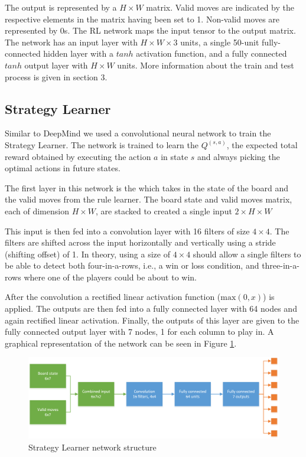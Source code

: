 The output is represented by a $H \times W$ matrix. Valid moves are indicated by the respective elements in the matrix having been set to 1. Non-valid moves are represented by 0s.
The RL network maps the input tensor to the output matrix. The network has an input layer with $H \times W \times 3$ units, a single 50-unit fully-connected hidden layer with a $tanh$ activation function, and a fully connected $tanh$ output layer with $H \times W$ units. More information about the train and test process is given in section 3.

\subsection{Strategy Learner}
Similar to DeepMind we used a convolutional neural network to train the Strategy Learner. The network is trained to learn the $Q^(s, a)$, the expected total reward obtained by executing the action $a$ in state $s$ and always picking the optimal actions in future states.

The first layer in this network is the which takes in the state of the board and the valid moves from the rule learner. The board state and valid moves matrix, each of dimension $H \times W$, are stacked to created a single input $2 \times H \times W$

This input is then fed into a convolution layer with 16 filters of size $4 \times 4$. The filters are shifted across the input horizontally and vertically using a stride (shifting offset) of 1. In theory, using a size of $4 \times 4$ should allow a single filters to be able to detect both four-in-a-rows, i.e., a win or loss condition, and three-in-a-rows where one of the players could be about to win.

After the convolution a rectified linear activation function ($\text{max}(0, x)$) is applied. The outputs are then fed into a fully connected layer with 64 nodes and again rectified linear activation. Finally, the outputs of this layer are given to the fully connected output layer with 7 nodes, 1 for each column to play in. A graphical representation of the network can be seen in Figure \ref{fig:strat_learn}.

\begin{figure}
  \includegraphics[width=\textwidth]{Network1.png}
  \caption{Strategy Learner network structure}
  \label{fig:strat_learn}
\end{figure}

